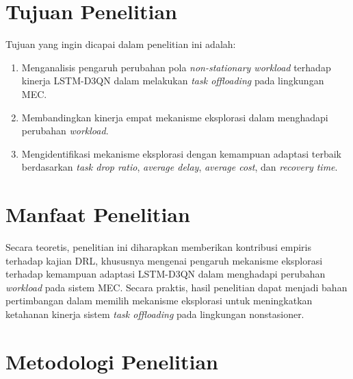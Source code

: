 \vspace{1cm}
\section{Tujuan Penelitian}
\label{sec:tujuan_penelitian}

Tujuan yang ingin dicapai dalam penelitian ini adalah:
\begin{enumerate}[leftmargin=*, noitemsep, topsep=0.3ex]
	\item Menganalisis pengaruh perubahan pola \textit{non-stationary workload} terhadap kinerja LSTM-D3QN dalam melakukan \textit{task offloading} pada lingkungan MEC.
	\item Membandingkan kinerja empat mekanisme eksplorasi dalam menghadapi perubahan \textit{workload}.
	\item Mengidentifikasi mekanisme eksplorasi dengan kemampuan adaptasi terbaik berdasarkan \textit{task drop ratio}, \textit{average delay}, \textit{average cost}, dan \textit{recovery time}.
\end{enumerate}

\vspace{1cm}
\section{Manfaat Penelitian}
\label{sec:manfaat_penelitian}

Secara teoretis, penelitian ini diharapkan memberikan kontribusi empiris terhadap kajian DRL, khususnya mengenai pengaruh mekanisme eksplorasi terhadap kemampuan adaptasi LSTM-D3QN dalam menghadapi perubahan \textit{workload} pada sistem MEC. Secara praktis, hasil penelitian dapat menjadi bahan pertimbangan dalam memilih mekanisme eksplorasi untuk meningkatkan ketahanan kinerja sistem \textit{task offloading} pada lingkungan nonstasioner.

\clearpage
\section{Metodologi Penelitian}
\label{sec:metodologi_penelitian}

